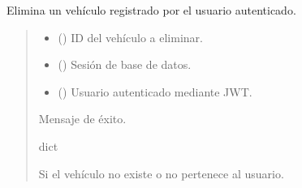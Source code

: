 \documentclass[letterpaper,10pt,spanish]{sphinxmanual}
\begin{document}

\begin{fulllineitems}
\label{\detokenize{endpoints:main.eliminar_vehiculo}}
\pysigstartsignatures
\pysiglinewithargsret
{}
{\sphinxparamcomma {}\sphinxparamcomma {}}
{}
\pysigstopsignatures
\sphinxAtStartPar
Elimina un vehículo registrado por el usuario autenticado.
\begin{quote}\begin{description}
\begin{itemize}
\item {} 
\sphinxAtStartPar
{} () \textendash{} ID del vehículo a eliminar.

\item {} 
\sphinxAtStartPar
{} () \textendash{} Sesión de base de datos.

\item {} 
\sphinxAtStartPar
{} ({\hyperref[\detokenize{modelos:main.Usuario}]{}}) \textendash{} Usuario autenticado mediante JWT.

\end{itemize}

\sphinxAtStartPar
Mensaje de éxito.

\sphinxAtStartPar
dict

\sphinxAtStartPar
{} \textendash{} Si el vehículo no existe o no pertenece al usuario.

\end{description}\end{quote}

\end{fulllineitems}
\end{document}
